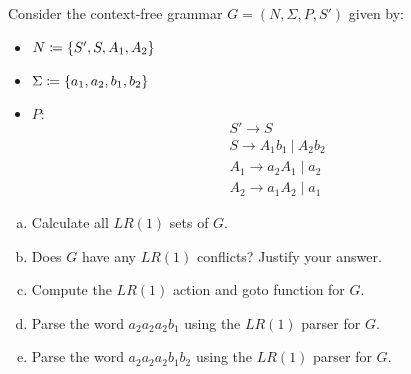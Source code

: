 \begin{exercise}{30}
Consider the context-free grammar $G = (N, \Sigma, P, S')$ given by:
\begin{itemize}
	\item $N \coloneqq \left\{ S', S, A_1, A_2 \right\}$
	\item $\Sigma \coloneqq \left\{ a_1, a_2, b_1, b_2 \right\}$
	\item $P:$
	\begin{align*}
		&S'   \to S \\
		&S    \to A_1 b_1 ~|~ A_2 b_2  \\
		&A_1  \to a_2 A_1 \mid a_2 \\
		&A_2  \to a_1 A_2 \mid a_1
	\end{align*}
\end{itemize}
\begin{enumerate}[(a)]
\item Calculate all $LR(1)$ sets of $G$.
\item Does $G$ have any $LR(1)$ conflicts? Justify your answer.
\item Compute the $LR(1)$ action and goto function for $G$.
\item Parse the word $a_2 a_2 a_2 b_1$ using the $LR(1)$ parser for $G$.
\item Parse the word $a_2 a_2 a_2 b_1 b_2$ using the $LR(1)$ parser for $G$.
\end{enumerate}
\end{exercise}

